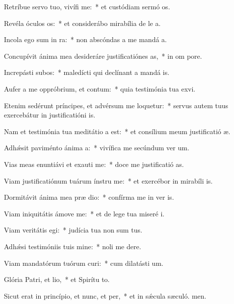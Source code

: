 \item Retríbue servo tuo, vivífi me:~* et custódiam sermó os.
\item Revéla óculos os:~* et considerábo mirabília de le a.
\item Incola ego sum in ra:~* non abscóndas a me mandá a.
\item Concupívit ánima mea desideráre justificatiónes as,~* in om pore.
\item Increpásti subos:~* maledícti qui declínant a mandá is.
\item Aufer a me oppróbrium, et contum:~* quia testimónia tua exvi.
\item Etenim sedérunt príncipes, et advérsum me loquetur:~* servus autem tuus exercebátur in justificatióni is.
\item Nam et testimónia tua meditátio a est:~* et consílium meum justificatió æ.
\item Adhǽsit paviménto ánima a:~* vivífica me secúndum ver um.
\item Vias meas enuntiávi et exauti me:~* doce me justificatió as.
\item Viam justificatiónum tuárum ínstru me:~* et exercébor in mirabíli is.
\item Dormitávit ánima mea præ dio:~* confírma me in ver is.
\item Viam iniquitátis ámove  me:~* et de lege tua miseré i.
\item Viam veritátis egi:~* judícia tua non sum tus.
\item Adhǽsi testimóniis tuis mine:~* noli me dere.
\item Viam mandatórum tuórum curi:~* cum dilatásti  um.
\item Glória Patri, et lio,~* et Spirítu to.
\item Sicut erat in princípio, et nunc, et per,~* et in sǽcula sæculó. men.
